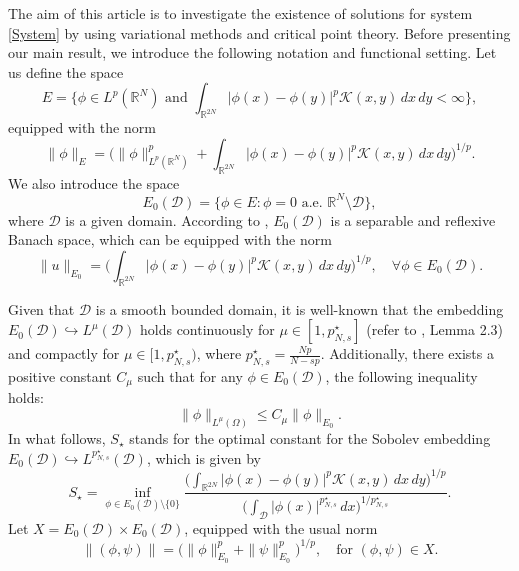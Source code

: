 \documentclass[reqno]{amsart}
\begin{document}
The aim of this article is to investigate the existence of solutions for 
system \eqref{System} by  using variational methods and critical point theory. 
Before presenting our main result, we introduce the following notation and
functional setting. Let us define the space
$$
E=\Big\lbrace \phi\in L^p(\mathbb{R}^N) \text{ and }
  \int_{\mathbb{R}^{2N}}|\phi(x)-\phi(y)|^p \mathcal{K}(x,y)\,dx\,dy
  <\infty\Big\rbrace,
$$
equipped with the norm
$$
\| \phi\|_{E}=\Big(\| \phi\|_{L^p(\mathbb{R}^N)}^{p}
+\int_{\mathbb{R}^{2N}}|\phi(x)-\phi(y)|^p \mathcal{K}(x,y)\,dx\,dy
\Big)^{1/p}.
$$
We also introduce the  space
$$
E_0(\mathcal{D})=\Big\lbrace  \phi\in E:
 \phi=0 \text{ a.e. }  \mathbb{R}^N\setminus\mathcal{D}\Big\rbrace,
$$
where $\mathcal{D}$ is a given domain.
 According to \cite[Lemma 4]{z}, $E_0(\mathcal{D})$ is a separable and reflexive 
 Banach space, which can be equipped with the  norm
\begin{equation*}
\| u\|_{E_0}=\Big(\int_{\mathbb{R}^{2N}}|\phi(x)-\phi(y)
|^p \mathcal{K}(x,y)\,dx\,dy\Big)^{1/p},\quad \forall \phi\in E_0(\mathcal{D}).
\end{equation*}

Given that $\mathcal{D}$ is a smooth bounded domain, it is well-known that the embedding $E_0(\mathcal{D})\hookrightarrow L^\mu(\mathcal{D})$ holds continuously for $\mu\in [1,p^\star_{N,s}]$ (refer to \cite{nez}, Lemma 2.3) and compactly for $\mu\in [1,p^\star_{N,s})$, where $p^\star_{N,s}=\frac{Np}{N-sp}$. Additionally, there exists a positive constant $C_\mu$ such that for any $\phi\in E_0(\mathcal{D})$, the following inequality holds:
\begin{equation}\label{sobolevinequaity}
\| \phi\|_{L^\mu(\Omega)}\leq C_\mu \| \phi\|_{E_0}.
\end{equation}
In what follows, $S_\star$ stands for the optimal constant for the Sobolev embedding 
$E_0(\mathcal{D})\hookrightarrow L^{p^\star_{N,s}}(\mathcal{D})$, 
which is given by
\begin{equation}\label{S1}
S_\star=\inf_{\phi\in E_0(\mathcal{D})\setminus \lbrace 0\rbrace}
\frac{{\big(\int_{\mathbb{R}^{2N}}|\phi(x)-\phi(y)|^p\mathcal{K}(x,y)\,dx\,dy
\big)^{1/p}}}{{\big(\int_\mathcal{D} |\phi(x)|^{p^\star_{N,s}}\,dx
\big)^{1/p^\star_{N,s}}}}.
\end{equation}
Let $X=E_0(\mathcal{D})\times E_0(\mathcal{D})$, equipped with the usual norm 
$$
\| (\phi,\psi)\|=\Big(\| \phi\|_{E_0}^p+\| \psi\|_{E_0}^p\Big)^{1/p},
\quad \text{for } (\phi,\psi)\in X.
$$
\end{document}
